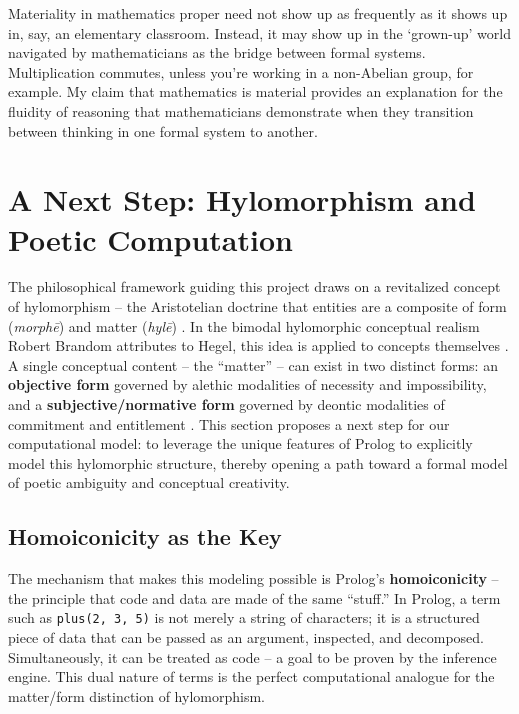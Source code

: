 \documentclass[12pt]{book}
\begin{document}
Materiality in mathematics proper need not show up as frequently as it shows up in, say, an elementary classroom. Instead, it may show up in the `grown-up' world navigated by mathematicians as the bridge between formal systems. Multiplication commutes, unless you're working in a non-Abelian group, for example. My claim that mathematics is material provides an explanation for the fluidity of reasoning that mathematicians demonstrate when they transition between thinking in one formal system to another. 


\section{A Next Step: Hylomorphism and Poetic Computation}

The philosophical framework guiding this project draws on a revitalized concept of hylomorphism -- the Aristotelian doctrine that entities are a composite of form (\textit{morphē}) and matter (\textit{hylē}) \parencite[310]{inwood1992hegel}. In the bimodal hylomorphic conceptual realism Robert Brandom attributes to Hegel, this idea is applied to concepts themselves \parencite{Brandom:2019aa}. A single conceptual content -- the ``matter'' -- can exist in two distinct forms: an \textbf{objective form} governed by alethic modalities of necessity and impossibility, and a \textbf{subjective/normative form} governed by deontic modalities of commitment and entitlement \parencite{Brandom:2019aa}. This section proposes a next step for our computational model: to leverage the unique features of Prolog to explicitly model this hylomorphic structure, thereby opening a path toward a formal model of poetic ambiguity and conceptual creativity.

\subsection{Homoiconicity as the Key}

The mechanism that makes this modeling possible is Prolog's \textbf{homoiconicity} -- the principle that code and data are made of the same ``stuff.'' In Prolog, a term such as \texttt{plus(2, 3, 5)} is not merely a string of characters; it is a structured piece of data that can be passed as an argument, inspected, and decomposed. Simultaneously, it can be treated as code -- a goal to be proven by the inference engine. This dual nature of terms is the perfect computational analogue for the matter/form distinction of hylomorphism.
\end{document}
